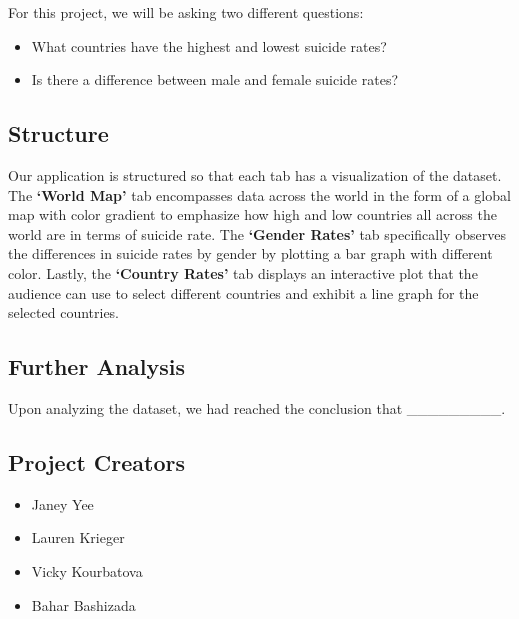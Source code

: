 \documentclass[
]{article}
\providecommand{\tightlist}{%
  \setlength{\itemsep}{0pt}\setlength{\parskip}{0pt}}
\begin{document}
For this project, we will be asking two different questions:

\begin{itemize}
\tightlist
\item
  What countries have the highest and lowest suicide rates?
\item
  Is there a difference between male and female suicide rates?
\end{itemize}

\hypertarget{structure}{%
\subsection{Structure}\label{structure}}

Our application is structured so that each tab has a visualization of
the dataset. The \textbf{`World Map'} tab encompasses data across the
world in the form of a global map with color gradient to emphasize how
high and low countries all across the world are in terms of suicide
rate. The \textbf{`Gender Rates'} tab specifically observes the
differences in suicide rates by gender by plotting a bar graph with
different color. Lastly, the \textbf{`Country Rates'} tab displays an
interactive plot that the audience can use to select different countries
and exhibit a line graph for the selected countries.

\hypertarget{further-analysis}{%
\subsection{Further Analysis}\label{further-analysis}}

Upon analyzing the dataset, we had reached the conclusion that
\_\_\_\_\_\_\_\_\_.

\hypertarget{project-creators}{%
\subsection{Project Creators}\label{project-creators}}

\begin{itemize}
\tightlist
\item
  Janey Yee
\item
  Lauren Krieger
\item
  Vicky Kourbatova
\item
  Bahar Bashizada
\end{itemize}
\end{document}
